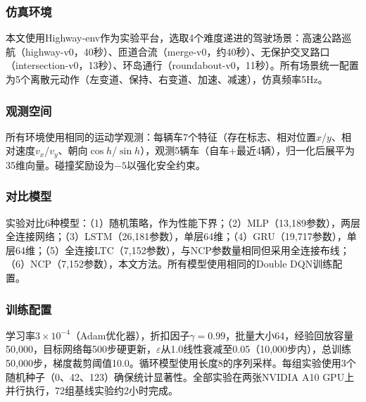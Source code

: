 \xiaosi

\subsubsection{仿真环境}

本文使用Highway-env\cite{leurent2018highway}作为实验平台，选取4个难度递进的驾驶场景：高速公路巡航（highway-v0，40秒）、匝道合流（merge-v0，约40秒）、无保护交叉路口（intersection-v0，13秒）、环岛通行（roundabout-v0，11秒）。所有场景统一配置为5个离散元动作（左变道、保持、右变道、加速、减速），仿真频率5Hz。

\subsubsection{观测空间}

所有环境使用相同的运动学观测：每辆车7个特征（存在标志、相对位置$x$/$y$、相对速度$v_x$/$v_y$、朝向$\cos h$/$\sin h$），观测5辆车（自车+最近4辆），归一化后展平为35维向量。碰撞奖励设为$-5$以强化安全约束。

\subsubsection{对比模型}

实验对比6种模型：（1）随机策略，作为性能下界；（2）MLP（13,189参数），两层全连接网络；（3）LSTM（26,181参数），单层64维；（4）GRU（19,717参数），单层64维；（5）全连接LTC（7,152参数），与NCP参数量相同但采用全连接布线；（6）NCP（7,152参数），本文方法。所有模型使用相同的Double DQN训练配置。

\subsubsection{训练配置}

学习率$3 \times 10^{-4}$（Adam优化器），折扣因子$\gamma = 0.99$，批量大小64，经验回放容量50,000，目标网络每500步硬更新，$\varepsilon$从1.0线性衰减至0.05（10,000步内），总训练50,000步，梯度裁剪阈值10.0。循环模型使用长度8的序列采样。每组实验使用3个随机种子（0、42、123）确保统计显著性。全部实验在两张NVIDIA A10 GPU上并行执行，72组基线实验约2小时完成。
